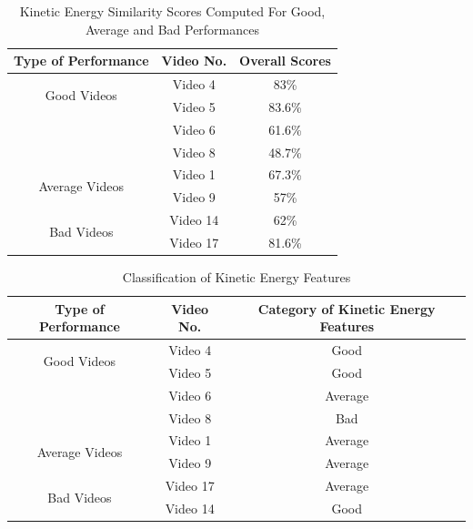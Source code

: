   \begin{table}
    \centering
    \begin{tabular}{|c|c|c|}
      \hline
      Type of Performance & Video No. & Overall Scores   \\
          \hline
          \hline
          
          \multirow{2}{*}{Good Videos} 
            & Video 4 & 83\% \\ \cline{2-3}
            & Video 5 & 83.6\% \\ \cline{2-3}
            & Video 6 & 61.6\% \\ \cline{2-3}
            & Video 8 & 48.7\% \\ \cline{2-3}
            \hline

            \multirow{2}{*}{Average Videos} 
            & Video 1 & 67.3\% \\ \cline{2-3}
            & Video 9 & 57\% \\ \cline{2-3}
            \hline

            \multirow{2}{*}{Bad Videos} 
            & Video 14 & 62\% \\ \cline{2-3}
            & Video 17 & 81.6\% \\ \cline{2-3}
            \hline
    \end{tabular}
  \caption{Kinetic Energy Similarity Scores Computed For Good, Average and Bad Performances}
  \label{table:KEScores}
  \end{table}

  \begin{table}
    \centering
    \begin{tabular}{|c|c|c|}
      \hline
      Type of Performance & Video No. & Category of Kinetic Energy Features   \\
          \hline
          \hline
          \multirow{2}{*}{Good Videos} 
            & Video 4 &  Good \\ \cline{2-3}
            & Video 5 &  Good \\ \cline{2-3}
            & Video 6 &  Average \\ \cline{2-3}
            & Video 8 &  Bad \\ \cline{2-3}
            \hline
  
            \multirow{2}{*}{Average Videos} 
            & Video 1 &  Average  \\ \cline{2-3}
            & Video 9 &  Average  \\ \cline{2-3}
            \hline
  
            \multirow{2}{*}{Bad Videos} 
            & Video 17 &  Average  \\ \cline{2-3}
            & Video 14 &  Good  \\ \cline{2-3}
            \hline
    \end{tabular}
  \caption{Classification of Kinetic Energy Features}
  \label{table:KEClassification}
  \end{table}

